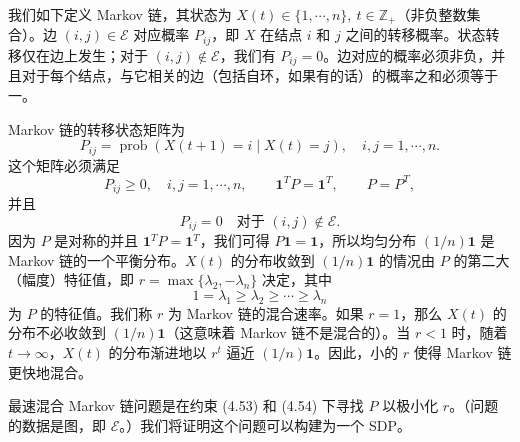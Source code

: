 \documentclass[UTF8, 12pt, fontset=fandol, oneside]{ctexart}
\begin{document}
我们如下定义 Markov 链，其状态为 $X(t)\in\{1,\cdots,n\},\ t\in\mathbb{Z}_+$（非负整数集合）。边 $(i,j)\in\mathcal{E}$ 对应概率 $P_{ij}$，即 $X$ 在结点 $i$ 和 $j$ 之间的转移概率。状态转移仅在边上发生；对于 $(i,j)\notin\mathcal{E}$，我们有 $P_{ij}=0$。边对应的概率必须非负，并且对于每个结点，与它相关的边（包括自环，如果有的话）的概率之和必须等于一。

Markov 链的转移状态矩阵为
\[
P_{ij}=\operatorname{prob}(X(t+1)=i\mid X(t)=j),\quad i,j=1,\cdots,n.
\]
这个矩阵必须满足
\begin{equation}
P_{ij}\geq 0,\quad i,j=1,\cdots,n,\qquad \mathbf{1}^TP=\mathbf{1}^T,\qquad P=P^T,
\tag{4.53}
\end{equation}
并且
\begin{equation}
P_{ij}=0\quad \text{对于 }(i,j)\notin\mathcal{E}.
\tag{4.54}
\end{equation}
因为 $P$ 是对称的并且 $\mathbf{1}^TP=\mathbf{1}^T$，我们可得 $P\mathbf{1}=\mathbf{1}$，所以均匀分布 $(1/n)\mathbf{1}$ 是 Markov 链的一个平衡分布。$X(t)$ 的分布收敛到 $(1/n)\mathbf{1}$ 的情况由 $P$ 的第二大（幅度）特征值，即 $r=\max\{\lambda_2,-\lambda_n\}$ 决定，其中
\[
1=\lambda_1\geq \lambda_2\geq\cdots\geq \lambda_n
\]
为 $P$ 的特征值。我们称 $r$ 为 Markov 链的混合速率。如果 $r=1$，那么 $X(t)$ 的分布不必收敛到 $(1/n)\mathbf{1}$（这意味着 Markov 链不是混合的）。当 $r<1$ 时，随着 $t\to\infty$，$X(t)$ 的分布渐进地以 $r^t$ 逼近 $(1/n)\mathbf{1}$。因此，小的 $r$ 使得 Markov 链更快地混合。

最速混合 Markov 链问题是在约束 (4.53) 和 (4.54) 下寻找 $P$ 以极小化 $r$。（问题的数据是图，即 $\mathcal{E}$。）我们将证明这个问题可以构建为一个 SDP。
\end{document}
